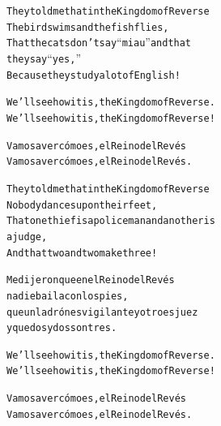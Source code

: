 \documentclass[11pt,a4paper]{article}
\begin{document}
\begin{parcolumns}[distance=8em,nofirstindent=true]{2}

\colchunk
{
\begin{alltt}\normalfont
They told me that in the Kingdom of Reverse
The bird swims and the fish flies,
That the cats don’t say “miau” and that
they say “yes,”
Because they study a lot of English!
\end{alltt}
}


\colplacechunks

\colchunk
{
\begin{alltt}\normalfont
We’ll see how it is, the Kingdom of Reverse.
We’ll see how it is, the Kingdom of Reverse!
\end{alltt}
}

\colchunk
{
\begin{alltt}\normalfont
Vamos a ver cómo es, el Reino del Revés\\
Vamos a ver cómo es, el Reino del Revés.
\end{alltt}
}

\colplacechunks

\colchunk
{
\begin{alltt}\normalfont
They told me that in the Kingdom of Reverse
Nobody dances upon their feet,
That one thief is a policeman and another is
a judge,
And that two and two make three!
\end{alltt}
}

\colchunk
{
\begin{alltt}\normalfont
Me dijeron que en el Reino del Revés
nadie baila con los pies,
que un ladrón es vigilante y otro es juez
y que dos y dos son tres.
\end{alltt}
}

\colplacechunks

\colchunk
{
\begin{alltt}\normalfont
We’ll see how it is, the Kingdom of Reverse.
We’ll see how it is, the Kingdom of Reverse!
\end{alltt}
}

\colchunk
{
\begin{alltt}\normalfont
Vamos a ver cómo es, el Reino del Revés
Vamos a ver cómo es, el Reino del Revés.
\end{alltt}
}


\end{parcolumns}
\end{document}
